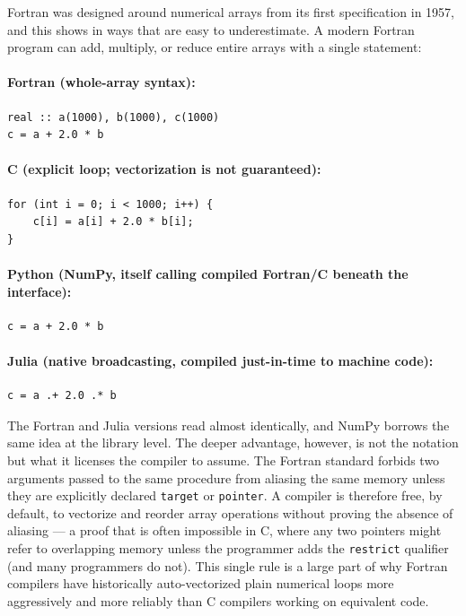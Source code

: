 Fortran was designed around numerical arrays from its first specification in 1957, and this shows in ways that are easy to underestimate. A modern Fortran program can add, multiply, or reduce entire arrays with a single statement:

\paragraph{Fortran (whole-array syntax):}
\begin{verbatim}
real :: a(1000), b(1000), c(1000)
c = a + 2.0 * b
\end{verbatim}

\paragraph{C (explicit loop; vectorization is not guaranteed):}
\begin{verbatim}
for (int i = 0; i < 1000; i++) {
    c[i] = a[i] + 2.0 * b[i];
}
\end{verbatim}

\paragraph{Python (NumPy, itself calling compiled Fortran/C beneath the interface):}
\begin{verbatim}
c = a + 2.0 * b
\end{verbatim}

\paragraph{Julia (native broadcasting, compiled just-in-time to machine code):}
\begin{verbatim}
c = a .+ 2.0 .* b
\end{verbatim}

The Fortran and Julia versions read almost identically, and NumPy borrows the same idea at the library level. The deeper advantage, however, is not the notation but what it licenses the compiler to assume. The Fortran standard forbids two arguments passed to the same procedure from aliasing the same memory unless they are explicitly declared \texttt{target} or \texttt{pointer}. A compiler is therefore free, by default, to vectorize and reorder array operations without proving the absence of aliasing --- a proof that is often impossible in C, where any two pointers might refer to overlapping memory unless the programmer adds the \texttt{restrict} qualifier (and many programmers do not). This single rule is a large part of why Fortran compilers have historically auto-vectorized plain numerical loops more aggressively and more reliably than C compilers working on equivalent code.

